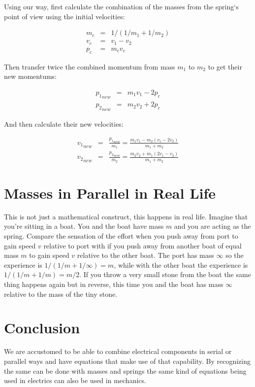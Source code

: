 \documentclass[]{../common/elementary-physics}
\begin{document}
Using our way, first calculate the combination of the masses from the spring`s point of view using the initial velocities:

\begin{eqnarray}
m_c &=& 1/(1/m_1 + 1/m_2) \\
v_c &=& v_1 - v_2 \\
p_c &=& m_c v_c
\end{eqnarray}

Then transfer twice the combined momentum from mass $m_1$ to $m_2$ to get their new momentums:

\begin{eqnarray}
{p_1}_{new} &=& m_1 v_1 - 2 p_c \\
{p_2}_{new} &=& m_2 v_2 + 2 p_c
\end{eqnarray}

And then calculate their new velocities:

\begin{eqnarray}
{v_1}_{new} &=& \frac{{p_1}_{new}}{m_1} = \frac{m_1 v_1 - m_2(v_1 - 2 v_2)}{m_1 + m_2} \\
{v_2}_{new} &=& \frac{{p_2}_{new}}{m_2} = \frac{m_2 v_2 + m_1(2 v_1 - v_2)}{m_1 + m_2}
\end{eqnarray}

\section{Masses in Parallel in Real Life}

This is not just a mathematical construct, this happens in real life.
Imagine that you're sitting in a boat.
You and the boat have mass $m$ and you are acting as the spring.
Compare the sensation of the effort when you push away from port to gain speed $v$ relative to port with if you push away from another boat of equal mass $m$ to gain speed $v$ relative to the other boat.
The port has mass $\infty$ so the experience is $1/(1/m + 1/\infty) = m$, while with the other boat the experience is $1/(1/m + 1/m) = m/2$.
If you throw a very small stone from the boat the same thing happens again but in reverse, this time you and the boat has mass $\infty$ relative to the mass of the tiny stone.

\section{Conclusion}

We are accustomed to be able to combine electrical components in serial or parallel ways and have equations that make use of that capability.
By recognizing the same can be done with masses and springs the same kind of equations being used in electrics can also be used in mechanics.
\end{document}
